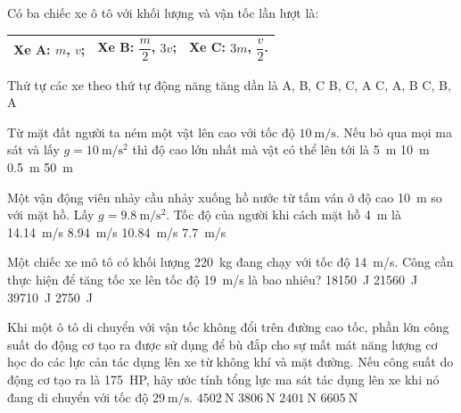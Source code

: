 \begin{ex}
	Có ba chiếc xe ô tô với khối lượng và vận tốc lần lượt là:
	\begin{center}
		\renewcommand{\arraystretch}{1.8}
		\begin{tabular}{|M{5cm}|M{5cm}|M{5cm}|}
			\hline
			Xe A: $m$, $v$;&Xe B: $\dfrac{m}{2}$, $3v$; &Xe C: $3m$, $\dfrac{v}{2}$.\\
			\hline
		\end{tabular}
	\end{center}
	Thứ tự các xe theo thứ tự động năng tăng dần là
	\choice
	{A, B, C}
	{B, C, A}
	{\True  C, A, B}
	{C, B, A}
	\loigiai{}
\end{ex}
\begin{ex}
	Từ mặt đất người ta ném một vật lên cao với tốc độ $\SI{10}{\meter/\second}$. Nếu bỏ qua mọi ma sát và lấy $g=\SI{10}{\meter/\second^2}$ thì độ cao lớn nhất mà vật có thể lên tới là
	\choice
	{\True \SI{5}{\meter}}
	{\SI{10}{\meter}}
	{\SI{0.5}{\meter}}
	{\SI{50}{\meter}}
	\loigiai{}
\end{ex}
\begin{ex}
	Một vận động viên nhảy cầu nhảy xuống hồ nước từ tấm ván ở độ cao \SI{10}{\meter} so với mặt hồ. Lấy $g=\SI{9.8}{\meter/\second^2}$. Tốc độ của người khi cách mặt hồ \SI{4}{\meter} là
	\choice
	{\SI{14.14}{\meter/\second}}
	{\SI{8.94}{\meter/\second}}
	{\True \SI{10.84}{\meter/\second}}
	{\SI{7.7}{\meter/\second}}
	\loigiai{}
\end{ex}
\begin{ex}
	Một chiếc xe mô tô có khối lượng \SI{220}{\kilogram} đang chạy với tốc độ \SI{14}{\meter/\second}. Công cần thực hiện để tăng tốc xe lên tốc độ \SI{19}{\meter/\second} là bao nhiêu?
	\choice
	{\True \SI{18150}{\joule}}
	{\SI{21560}{\joule}}
	{\SI{39710}{\joule}}
	{\SI{2750}{\joule}}
	\loigiai{}
\end{ex}
\begin{ex}
	Khi một ô tô di chuyển với vận tốc không đổi trên đường cao tốc, phần lớn công suất do động cơ tạo ra được sử dụng để bù đắp cho sự mất mát năng lượng cơ học do các lực cản tác dụng lên xe từ không khí và mặt đường. Nếu công suất do động cơ tạo ra là \SI{175}{HP}, hãy ước tính tổng lực ma sát tác dụng lên xe khi nó đang di chuyển với tốc độ $\SI{29}{\meter / \second}$.
	\choice
	{\True $\SI{4502}{\newton}$}
	{$\SI{3806}{\newton}$}
	{$\SI{2401}{\newton}$}
	{$\SI{6605}{\newton}$}
	\loigiai{
		
	}
\end{ex}
